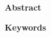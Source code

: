 
%
%
%
%
%
%
%
%
%
%
\clearpage
\null
\vfil
\begin{center}
 \textbf{Abstract}
\end{center}


%
%
%
%
%

\vspace{10em}
\begin{center}
 \textbf{Keywords}
\par
\end{center}
\vfil
